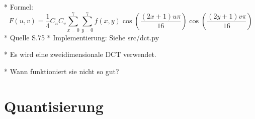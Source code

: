 * Formel: \[F(u,v) = \frac{1}{4} C_uC_v\sum_{x=0}^7 \sum_{y=0}^7 f(x,y) \cos \left(\frac{(2x+1)u\pi}{16}\right) \cos\left(\frac{(2y+1)v\pi}{16}\right) \]
	* Quelle \cite{symes_peter_digital_2004} S.75
* Implementierung: Siehe src/dct.py

* Es wird eine zweidimensionale DCT verwendet.

* Wann funktioniert sie nicht so gut?

\section{Quantisierung}
